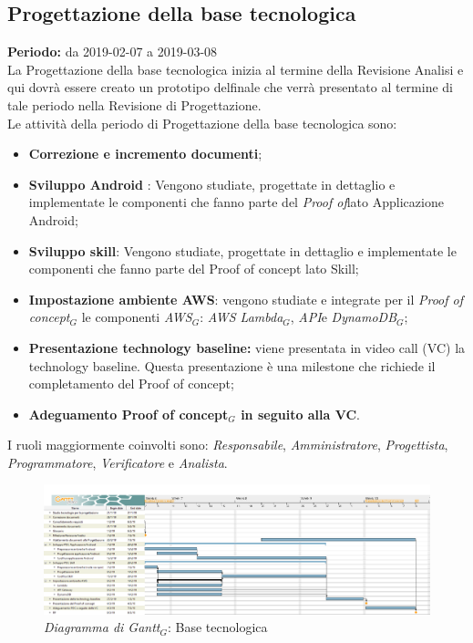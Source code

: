 \begin{flushleft}
\section{Progettazione della base tecnologica}
\textbf{Periodo:} da 2019-02-07 a 2019-03-08\\
La Progettazione della base tecnologica inizia al termine della Revisione Analisi e qui dovrà essere creato un prototipo delfinale che verrà presentato al termine di tale periodo nella Revisione di Progettazione.\\
Le attività della periodo di Progettazione della base tecnologica sono:
\begin{itemize}
	\item \textbf{Correzione e incremento documenti};
	\item \textbf{Sviluppo Android }: Vengono studiate, progettate in dettaglio e implementate le componenti che fanno parte del \textit{Proof of}lato Applicazione Android; 
	\item \textbf{Sviluppo skill}: Vengono studiate, progettate in dettaglio e implementate le componenti che fanno parte del Proof of concept lato Skill; 
    \item\textbf{Impostazione ambiente AWS}: vengono studiate e integrate per il \textit{Proof of concept$_{G}$} le componenti \textit{AWS$_{G}$}: \textit{AWS Lambda$_{G}$}, \textit{API}e \textit{DynamoDB$_{G}$};
    \item \textbf{Presentazione technology baseline:} viene presentata in video call (VC) la technology baseline. Questa presentazione è una milestone che richiede il completamento del Proof of concept;
    \item \textbf{Adeguamento \textbf{Proof of concept$_{G}$} in seguito alla VC}.
\end{itemize}
I ruoli maggiormente coinvolti sono: \textit{Responsabile}, \textit{Amministratore}, \textit{Progettista}, \textit{Programmatore}, \textit{Verificatore} e \textit{Analista}.
\begin{figure} [h]
    \centering
    \includegraphics[scale=0.2]{./images/ZeroSevenGanttProgettazione.png}
    \caption{\textit{Diagramma di Gantt$_{G}$}: Base tecnologica }\label{G3}
\end{figure}
\newpage

\end{flushleft}
